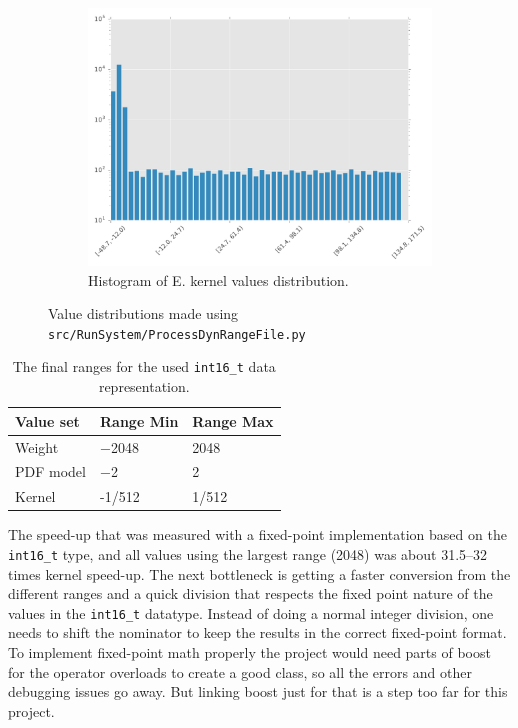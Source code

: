 \documentclass[final]{article}
\begin{document}
\begin{figure}[H]
\begin{subfigure}[b]{0.32\textwidth}
        \includegraphics[width=\textwidth]{resources/histogramE}
        \caption{Histogram of E. kernel values distribution.}
    \end{subfigure}
    \caption{Value distributions made using \texttt{src/RunSystem/ProcessDynRangeFile.py}}
    \label{fig:value-distributions}
\end{figure}

\begin{table}[H]
    \centering
    \caption{The final ranges for the used \texttt{int16\_t} data representation.}
    \label{tab:final-ranges}
    \begin{tabular}{lll}
        \toprule
        \textbf{Value set} & \textbf{Range Min} & \textbf{Range Max} \\
        \midrule
        Weight      &  \num{-2048}  &  \num{2048}     \\
        PDF model   &  \num{-2}   &  \num{2}      \\
        Kernel      &  \num{-1/512} &  \num{1/512}    \\
        \bottomrule
    \end{tabular}
\end{table}

The speed-up that was measured with a fixed-point implementation based on the \texttt{int16\_t} type, and all values using the largest range (\num{2048}) was about \SIrange{31.5}{32}{\speedup} times kernel speed-up.
The next bottleneck is getting a faster conversion from the different ranges and a quick division that respects the fixed point nature of the values in the \texttt{int16\_t} datatype.
Instead of doing a normal integer division, one needs to shift the nominator to keep the results in the correct fixed-point format.
To implement fixed-point math properly the project would need parts of boost for the operator overloads to create a good class, so all the errors and other debugging issues go away.
But linking boost just for that is a step too far for this project.
\end{document}
